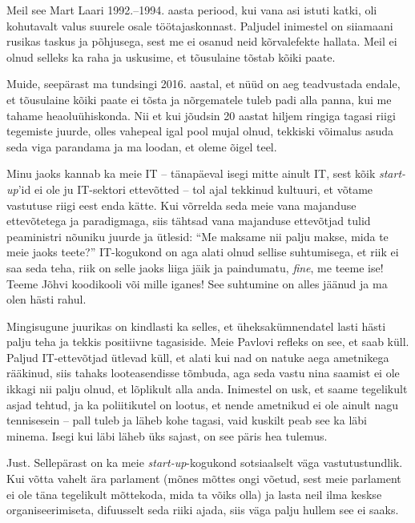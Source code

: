 Meil see Mart Laari  
1992.--1994. aasta periood, kui vana asi istuti katki, oli kohutavalt valus suurele 
osale töötajaskonnast. Paljudel inimestel on siiamaani rusikas taskus ja põhjusega, sest me ei osanud 
neid kõrvalefekte hallata. Meil ei olnud selleks ka raha ja 
uskusime, et tõusulaine tõstab kõiki paate.

Muide, seepärast ma tundsingi 2016. aastal, et nüüd on aeg teadvustada 
endale, et tõusulaine kõiki paate ei tõsta ja nõrgematele tuleb padi alla 
panna, kui me tahame heaoluühiskonda. Nii et kui jõudsin 20 aastat 
hiljem ringiga tagasi riigi tegemiste juurde, olles vahepeal igal pool mujal 
olnud, tekkiski võimalus asuda seda viga parandama ja ma loodan, et 
oleme õigel teel.


Minu jaoks kannab ka meie IT -- tänapäeval isegi mitte ainult IT, sest kõik 
\emph{start-up}'id ei ole ju IT-sektori ettevõtted -- tol ajal tekkinud 
kultuuri, et võtame vastutuse riigi eest enda kätte. Kui võrrelda 
seda meie vana majanduse ettevõtetega ja paradigmaga, siis tähtsad vana majanduse 
ettevõtjad tulid peaministri nõuniku juurde ja ütlesid: \enquote{Me maksame nii palju makse, mida te meie jaoks teete?} 
IT-kogukond on aga alati olnud sellise suhtumisega, et riik ei saa seda 
teha, riik on selle jaoks liiga jäik ja paindumatu, \emph{fine}, me teeme ise! 
Teeme Jõhvi koodikooli või mille iganes! See suhtumine on alles jäänud ja ma 
olen hästi rahul. 

Mingisugune juurikas on kindlasti ka selles, et 
üheksakümnendatel lasti hästi palju teha ja tekkis positiivne tagasiside. 
Meie Pavlovi refleks on see, et saab küll. Paljud 
IT-ettevõtjad ütlevad küll, et alati kui nad on natuke aega ametnikega rääkinud, siis tahaks looteasendisse tõmbuda, aga seda vastu nina saamist ei ole ikkagi 
nii palju olnud, et lõplikult alla anda. Inimestel on 
usk, et saame tegelikult asjad tehtud, ja ka poliitikutel 
on lootus, et nende ametnikud ei ole ainult nagu tennisesein -- pall tuleb ja 
läheb kohe tagasi, vaid kuskilt peab see ka läbi minema. Isegi kui 
läbi läheb üks sajast, on see päris hea tulemus.


Just. Sellepärast on ka meie \emph{start-up}-kogukond sotsiaalselt väga
vastutustundlik. Kui võtta vahelt ära parlament (mõnes
mõttes ongi võetud, sest meie parlament ei ole täna tegelikult mõttekoda, 
mida ta võiks olla) ja lasta neil ilma keskse organiseerimiseta, difuusselt 
seda riiki ajada, siis väga palju hullem see ei saaks.

